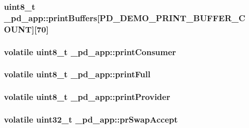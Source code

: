 \hypertarget{struct__pd__app_acae5bdb8d3a1a7624d440d766596a062}{
\subsubsection[{print\-Buffers}]{\setlength{\rightskip}{0pt plus 5cm}uint8\-\_\-t \-\_\-pd\-\_\-app\-::print\-Buffers\mbox{[}{\bf P\-D\-\_\-\-D\-E\-M\-O\-\_\-\-P\-R\-I\-N\-T\-\_\-\-B\-U\-F\-F\-E\-R\-\_\-\-C\-O\-U\-N\-T}\mbox{]}\mbox{[}70\mbox{]}}}\label{struct__pd__app_acae5bdb8d3a1a7624d440d766596a062}
\hypertarget{struct__pd__app_aab6771fc259fceda49fd93d3971c8f77}{
\subsubsection[{print\-Consumer}]{\setlength{\rightskip}{0pt plus 5cm}volatile uint8\-\_\-t \-\_\-pd\-\_\-app\-::print\-Consumer}}\label{struct__pd__app_aab6771fc259fceda49fd93d3971c8f77}
\hypertarget{struct__pd__app_ace27760f393eeceee39cf902b659cb67}{
\subsubsection[{print\-Full}]{\setlength{\rightskip}{0pt plus 5cm}volatile uint8\-\_\-t \-\_\-pd\-\_\-app\-::print\-Full}}\label{struct__pd__app_ace27760f393eeceee39cf902b659cb67}
\hypertarget{struct__pd__app_a5ed6114200d041b6c16989abea86dbde}{
\subsubsection[{print\-Provider}]{\setlength{\rightskip}{0pt plus 5cm}volatile uint8\-\_\-t \-\_\-pd\-\_\-app\-::print\-Provider}}\label{struct__pd__app_a5ed6114200d041b6c16989abea86dbde}
\hypertarget{struct__pd__app_ae6928ddf7cec733c1244b9f6a2034452}{
\subsubsection[{pr\-Swap\-Accept}]{\setlength{\rightskip}{0pt plus 5cm}volatile uint32\-\_\-t \-\_\-pd\-\_\-app\-::pr\-Swap\-Accept}}\label{struct__pd__app_ae6928ddf7cec733c1244b9f6a2034452}
